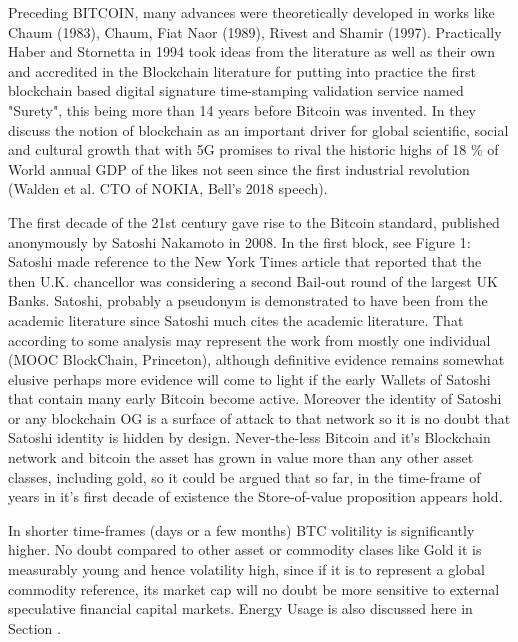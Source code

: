 \documentclass[final,5p,times,twocolumn,authoryear]{elsarticle}
\begin{document}
Preceding BITCOIN, many advances were theoretically developed in works like Chaum (1983), Chaum, Fiat Naor (1989), Rivest and Shamir (1997). Practically Haber and Stornetta in 1994 took ideas from the literature as well as their own \cite{Haber1991-we} and accredited in the Blockchain literature for putting into practice the first blockchain based digital signature time-stamping validation service named "Surety", this being more than 14 years before Bitcoin was invented. In \cite{Haber1991-we} they discuss the notion of blockchain as an important driver for global scientific, social and cultural growth that with 5G promises to rival the historic highs of 18 \% of World annual GDP of the likes not seen since the first industrial revolution (Walden et al. CTO of NOKIA, Bell's 2018 speech).


The first decade of the 21st century gave rise to the Bitcoin standard, published anonymously by Satoshi Nakamoto in 2008.  In the first block, see Figure 1: Satoshi made reference to the New York Times article that reported that the then U.K. chancellor was considering a second Bail-out round of the largest UK Banks. Satoshi, probably a pseudonym is demonstrated to have been from the academic literature since Satoshi much cites the academic literature. That according to some analysis may represent the work from mostly one individual (MOOC BlockChain, Princeton), although definitive evidence remains somewhat elusive perhaps more evidence will come to light if the early Wallets of Satoshi that contain many early Bitcoin become active. Moreover the identity of Satoshi or any blockchain OG is a surface of attack to that network so it is no doubt that Satoshi identity is hidden by design. Never-the-less Bitcoin and it's Blockchain network and bitcoin the asset has grown in value more than any other asset classes, including gold, so it could be argued that so far, in the time-frame of years in it's first decade of existence the Store-of-value proposition appears hold.

In shorter time-frames (days or a few months) BTC volitility is significantly higher. No doubt compared to other asset or commodity clases like Gold it is measurably young and hence volatility high, since if it is to represent a global commodity reference, its market cap will no doubt be more sensitive to external speculative financial capital markets. Energy Usage is also discussed here in Section . 
 
\end{document}

